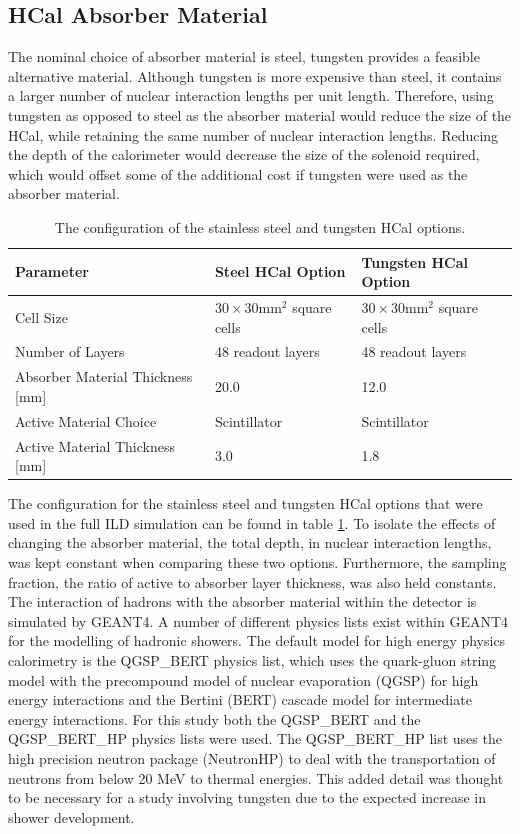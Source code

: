 \subsection{HCal Absorber Material}
\label{sec:hcalabsorbermaterial}

The nominal choice of absorber material is steel, tungsten provides a feasible alternative material.  Although tungsten is more expensive than steel, it contains a larger number of nuclear interaction lengths per unit length.  Therefore, using tungsten as opposed to steel as the absorber material would reduce the size of the HCal, while retaining the same number of nuclear interaction lengths.  Reducing the depth of the calorimeter would decrease the size of the solenoid required, which would offset some of the additional cost if tungsten were used as the absorber material. 

\begin{table}[h!]
\centering
\begin{tabular}{ l l l }
\hline
Parameter & Steel HCal Option & Tungsten HCal Option \\
\hline
Cell Size & $30 \times 30 \text{mm}^{2}$ square cells & $30 \times 30 \text{mm}^{2}$ square cells\\
Number of Layers & 48 readout layers & 48 readout layers\\
Absorber Material Thickness [mm] & 20.0 & 12.0 \\
Active Material Choice & Scintillator & Scintillator \\
Active Material Thickness [mm] & 3.0 & 1.8 \\
\hline
\end{tabular}
\caption[The configuration of the stainless steel and tungsten HCal options.]{The configuration of the stainless steel and tungsten HCal options.}
\label{table:hcalabsmaterial}
\end{table}

The configuration for the stainless steel and tungsten HCal options that were used in the full ILD simulation can be found in table \ref{table:hcalabsmaterial}.  To isolate the effects of changing the absorber material, the total depth, in nuclear interaction lengths, was kept constant when comparing these two options.  Furthermore, the sampling fraction, the ratio of active to absorber layer thickness, was also held constants.  The interaction of hadrons with the absorber material within the detector is simulated by GEANT4.  A number of different physics lists exist within GEANT4 for the modelling of hadronic showers.  The default model for high energy physics calorimetry is the QGSP\_BERT physics list, which uses the quark-gluon string model \cite{Folger:2003sb} with the precompound model of nuclear evaporation \cite{geantStringModel} (QGSP) for high energy interactions and the Bertini (BERT) cascade model \cite{Guthrie:1968ue} for intermediate energy interactions.  For this study both the QGSP\_BERT and the QGSP\_BERT\_HP physics lists were used.  The QGSP\_BERT\_HP list uses the high precision neutron package (NeutronHP) to deal with the transportation of neutrons from below 20 MeV to thermal energies.  This added detail was thought to be necessary for a study involving tungsten due to the expected increase in shower development.    

